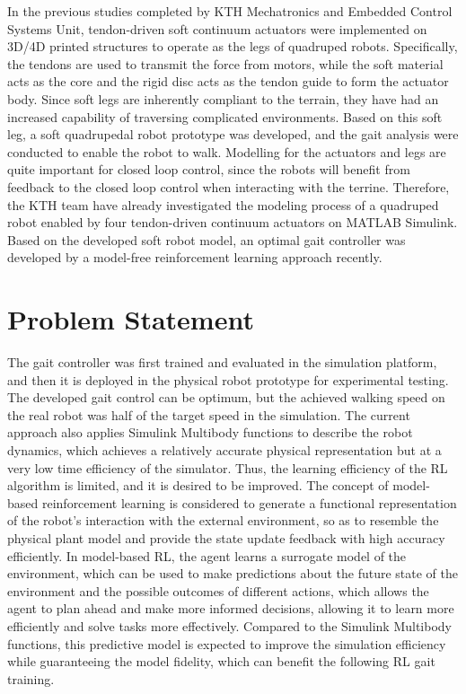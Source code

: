 In the previous studies\cite{thorapallimuralidharanContinuumActuatorBased2020} completed by KTH Mechatronics and Embedded Control Systems Unit, tendon-driven soft continuum actuators were implemented on 3D/4D printed structures to operate as the legs of quadruped robots. Specifically, the tendons are used to transmit the force from motors, while the soft material acts as the core and the rigid disc acts as the tendon guide to form the actuator body. Since soft legs are inherently compliant to the terrain, they have had an increased capability of traversing complicated environments. Based on this soft leg, a soft quadrupedal robot prototype was developed, and the gait analysis were conducted to enable the robot to walk\cite{daneliaStructureGaitOptimizationof2021}. Modelling for the actuators and legs are quite important for closed loop control, since the robots will benefit from feedback to the closed loop control when interacting with the terrine. Therefore, the KTH team\cite{muralidharanSoftQuadrupedRobot2021} have already investigated the modeling process of a quadruped robot enabled by four tendon-driven continuum actuators on MATLAB Simulink. Based on the developed soft robot model, an optimal gait controller was developed by a model-free reinforcement learning approach\cite{jiSynthesizingOptimalGait2022} recently.

\section{Problem Statement}
 The gait controller was first trained and evaluated in the simulation platform, and then it is deployed in the physical robot prototype for experimental testing. The developed gait control can be optimum, but the achieved walking speed on the real robot was half of the target speed in the simulation\cite{jiSynthesizingOptimalGait2022}. The current approach also applies Simulink Multibody functions to describe the robot dynamics, which achieves a relatively accurate physical representation but at a very low time efficiency of the simulator. Thus, the learning efficiency of the \ac{RL} algorithm is limited, and it is desired to be improved. The concept of model-based reinforcement learning is considered to generate a functional representation of the robot’s interaction with the external environment, so as to resemble the physical plant model and provide the state update feedback with high accuracy efficiently\cite{rayModelBasedReinforcementLearning2010}. In model-based \ac{RL}, the agent learns a surrogate model of the environment, which can be used to make predictions about the future state of the environment and the possible outcomes of different actions, which allows the agent to plan ahead and make more informed decisions, allowing it to learn more efficiently and solve tasks more effectively\cite{polydorosSurveyModelBasedReinforcement2017}. Compared to the Simulink Multibody functions, this predictive model is expected to improve the simulation efficiency while guaranteeing the model fidelity, which can benefit the following \ac{RL} gait training. 
 
